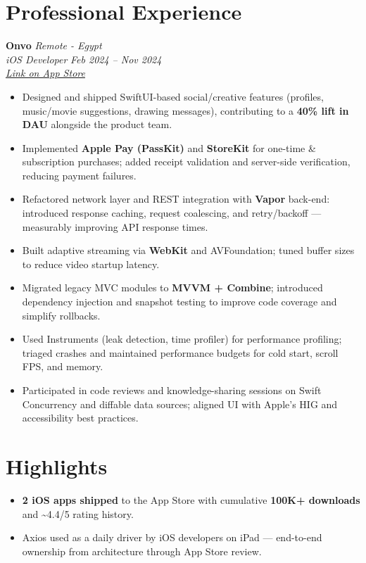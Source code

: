 \documentclass[a4paper,10pt]{article}
\begin{document}
\section*{Professional Experience}
\textbf{Onvo} \hfill \textit{Remote - Egypt} \\
\textit{iOS Developer} \hfill \textit{Feb 2024 -- Nov 2024}\\
\smallskip
\href{https://apps.apple.com/us/app/onvo-limitless-discoveries/id6474696334}{\textit{Link on App Store}}
\begin{itemize}
  \item Designed and shipped SwiftUI-based social/creative features (profiles, music/movie suggestions, drawing messages), contributing to a \textbf{40\% lift in DAU} alongside the product team.
  \item Implemented \textbf{Apple Pay (PassKit)} and \textbf{StoreKit} for one-time \& subscription purchases; added receipt validation and server-side verification, reducing payment failures.
  \item Refactored network layer and REST integration with \textbf{Vapor} back-end: introduced response caching, request coalescing, and retry/backoff --- measurably improving API response times.
  \item Built adaptive streaming via \textbf{WebKit} and AVFoundation; tuned buffer sizes to reduce video startup latency.
  \item Migrated legacy MVC modules to \textbf{MVVM + Combine}; introduced dependency injection and snapshot testing to improve code coverage and simplify rollbacks.
  \item Used Instruments (leak detection, time profiler) for performance profiling; triaged crashes and maintained performance budgets for cold start, scroll FPS, and memory.
  \item Participated in code reviews and knowledge-sharing sessions on Swift Concurrency and diffable data sources; aligned UI with Apple's HIG and accessibility best practices.
\end{itemize}

\section*{Highlights}
\begin{itemize}
  \item \textbf{2 iOS apps shipped} to the App Store with cumulative \textbf{100K+ downloads} and \textasciitilde4.4/5 rating history.
  \item Axios used as a daily driver by iOS developers on iPad --- end-to-end ownership from architecture through App Store review.
\end{itemize}
\end{document}
